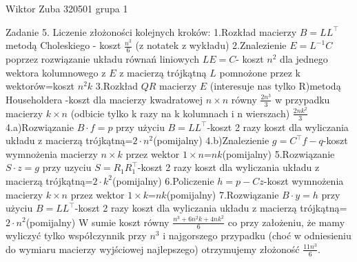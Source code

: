 \documentclass{article}
\begin{document}
 
Wiktor Zuba 320501 grupa 1
\newline

Zadanie 5.
\newline
Liczenie złożoności kolejnych kroków:\newline
1.Rozkład macierzy $B=LL^{\top}$ metodą Choleskiego - koszt $\frac{n^3}{6}$ (z notatek z wykładu)\newline\newline
2.Znalezienie $E=L^{-1}C$ poprzez rozwiązanie układu równań liniowych $LE=C$- koszt $n^2$ dla jednego wektora kolumnowego z $E$ z macierzą trójkątną $L$
pomnożone przez k wektorów=koszt $n^2k$\newline\newline
3.Rozkład $QR$ macierzy $E$ (interesuje nas tylko R)metodą Householdera -koszt dla macierzy kwadratowej $n\times n$ równy $\frac{2n^3}{3}$
w przypadku macierzy $k\times n$ (odbicie tylko k razy na k kolumnach i n wierszach) $\frac{2nk^2}{3}$\newline\newline
4.a)Rozwiązanie $B\cdot f=p$ przy użyciu $B=LL^{\top}$-koszt 2 razy koszt dla wyliczania układu z macierzą trójkątną=$2\cdot n^2$(pomijalny)\newline
4.b)Znalezienie $g=C^{\top}f-q$-koszt wymnożenia macierzy $n\times k$ przez wektor $1\times n$=$nk$(pomijalny)\newline\newline
5.Rozwiązanie $S\cdot z=g$ przy uzyciu $S=R_1R_1^{\top}$-koszt 2 razy koszt dla wyliczania układu z macierzą trójkątną=$2\cdot k^2$(pomijalny)\newline\newline
6.Policzenie $h=p-Cz$-koszt wymnożenia macierzy $k\times n$ przez wektor $1\times k$=$nk$(pomijalny)\newline\newline
7.Rozwiązanie $B\cdot y=h$ przy użyciu $B=LL^{\top}$-koszt 2 razy koszt dla wyliczania układu z macierzą trójkątną=$2\cdot n^2$(pomijalny)\newline\newline
W sumie koszt równy $\frac{n^3+6n^2k+4nk^2}{6}$ co przy założeniu, że mamy wyliczyć tylko współczynnik przy $n^3$ i najgorszego przypadku
(choć w odniesieniu do wymiaru macierzy wyjściowej najlepszego) otrzymujemy złożoność $\frac{11n^3}{6}$.
\end{document}
